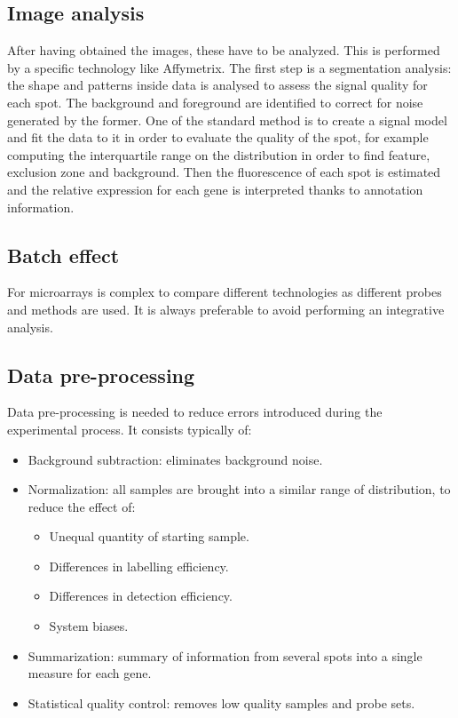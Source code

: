 	\subsection{Image analysis}
	After having obtained the images, these have to be analyzed.
	This is performed by a specific technology like Affymetrix.
	The first step is a segmentation analysis: the shape and patterns inside data is analysed to assess the signal quality for each spot.
	The background and foreground are identified to correct for noise generated by the former.
	One of the standard method is to create a signal model and fit the data to it in order to evaluate the quality of the spot, for example computing the interquartile range on the distribution in order to find feature, exclusion zone and background.
	Then the fluorescence of each spot is estimated and the relative expression for each gene is interpreted thanks to annotation information.

	\subsection{Batch effect}
	For microarrays is complex to compare different technologies as different probes and methods are used.
	It is always preferable to avoid performing an integrative analysis.

	\subsection{Data pre-processing}
	Data pre-processing is needed to reduce errors introduced during the experimental process.
	It consists typically of:

	\begin{multicols}{2}
		\begin{itemize}
			\item Background subtraction: eliminates background noise.
			\item Normalization: all samples are brought into a similar range of distribution, to reduce the effect of:

				\begin{itemize}
					\item Unequal quantity of starting sample.
					\item Differences in labelling efficiency.
					\item Differences in detection efficiency.
					\item System biases.
				\end{itemize}

			\item Summarization: summary of information from several spots into a single measure for each gene.
			\item Statistical quality control: removes low quality samples and probe sets.

		\end{itemize}
	\end{multicols}

